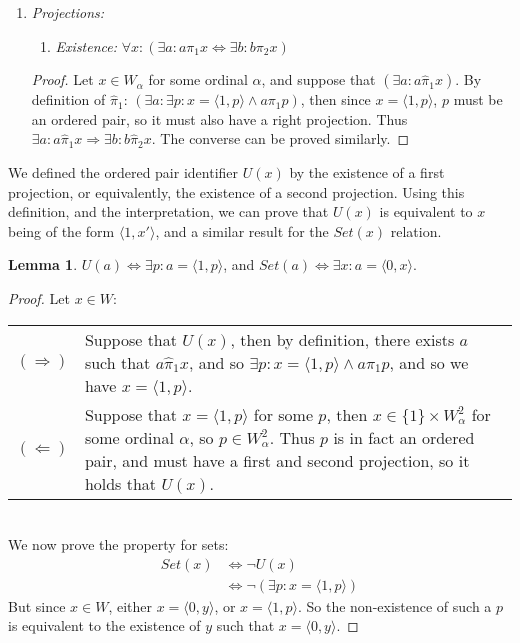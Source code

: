 \documentclass[11pt]{article}
\newcommand{\pleft}{\mathrel{\pi_1}}
\newcommand{\pright}{\mathrel{\pi_2}}
\newcommand{\pair}[2]{\langle #1,#2 \rangle}
\newcommand{\zpright}{\mathrel{\widehat{\pi}_2}}
\newcommand{\zpleft}{\mathrel{\widehat{\pi}_1}}
\theoremstyle{definition}
\theoremstyle{theorem}
\theoremstyle{lemma}
\newtheorem{lemma}[theorem]{Lemma}
\begin{document}
\begin{enumerate}[series=axiomlist, label=\Roman*.]
  \item \textit{Projections:}
        \begin{enumerate}[series=sublist, label=(\roman*)]
        \item \textit{Existence:} $\forall x: (\exists a: a\pleft x \Leftrightarrow \exists b: b\pright x)$
        \end{enumerate}
        \begin{proof}
        Let $x\in W_\alpha$ for some ordinal $\alpha$, and suppose that $(\exists a: a\zpleft x)$.
        By definition of $\zpleft$: $(\exists a: \exists p: x = \pair{1}{p} \wedge a \pleft p)$, then since $x = \pair{1}{p}$, $p$ must be an ordered pair, so it must also have a right projection.
        Thus $\exists a: a\zpleft x \Rightarrow \exists b: b\zpright x$.
        The converse can be proved similarly.
      \end{proof}

\end{enumerate}
We defined the ordered pair identifier $U(x)$ by the existence of a first projection, or equivalently, the existence of a second projection. Using this definition, and the interpretation, we can prove that $U(x)$ is equivalent to $x$ being of the form $\pair{1}{x'}$, and a similar result for the $\mathit{Set}(x)$ relation.
\begin{lemma} $U(a) \Leftrightarrow \exists p: a = \pair{1}{p}$, and $Set(a)\Leftrightarrow \exists x: a = \pair{0}{x}$.
  \begin{proof} Let $x\in W$:

    \begin{tabular}{p{7mm} p{10.6cm}}
      $(\Rightarrow)$\rule{0pt}{5mm} &
      Suppose that $U(x)$, then by definition, there exists $a$ such that $a\zpleft x$, and so $\exists p: x=\pair{1}{p} \wedge a\pleft p$, and so we have $x=\pair{1}{p}$.
      \\
      $(\Leftarrow)$ &\rule{0pt}{5mm}
      Suppose that $x = \pair{1}{p}$ for some $p$, then $x\in\{1\}\times W_\alpha^2$ for some ordinal $\alpha$, so $p\in W_\alpha^2$.
      Thus $p$ is in fact an ordered pair, and must have a first and second projection, so it holds that $U(x)$.
    \end{tabular}\\

    \noindent
    We now prove the property for sets:
    \begin{align*}
      \mathit{Set}(x) &\iff \neg U(x) \\
                      &\iff \neg (\exists p: x=\pair{1}{p})
    \end{align*}
    But since $x\in W$, either $x = \pair{0}{y}$, or $x = \pair{1}{p}$. So the non-existence of such a $p$ is equivalent to the existence of $y$ such that $x=\pair{0}{y}$.
  \end{proof}
\end{lemma}
\end{document}
